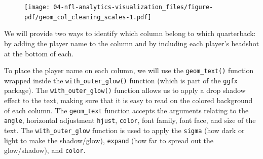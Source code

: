 \documentclass[
  letterpaper,
]{krantz}
\newenvironment{Shaded}{\begin{snugshade}}{\end{snugshade}}
\newcommand{\AttributeTok}[1]{\textcolor[rgb]{0.40,0.45,0.13}{#1}}
\newcommand{\DecValTok}[1]{\textcolor[rgb]{0.68,0.00,0.00}{#1}}
\newcommand{\FunctionTok}[1]{\textcolor[rgb]{0.28,0.35,0.67}{#1}}
\newcommand{\NormalTok}[1]{\textcolor[rgb]{0.00,0.23,0.31}{#1}}
\newcommand{\SpecialCharTok}[1]{\textcolor[rgb]{0.37,0.37,0.37}{#1}}
\newcommand{\StringTok}[1]{\textcolor[rgb]{0.13,0.47,0.30}{#1}}
\begin{document}
\begin{Shaded}
\end{Shaded}

\begin{figure}[H]

{\centering \texttt{[image: 04-nfl-analytics-visualization\_files/figure-pdf/geom\_col\_cleaning\_scales-1.pdf]}

}

\end{figure}

We will provide two ways to identify which column belong to which
quarterback: by adding the player name to the column and by including
each player's headshot at the bottom of each.

To place the player name on each column, we will use the
\texttt{geom\_text()} function wrapped inside the
\texttt{with\_outer\_glow()} function (which is part of the
\texttt{ggfx} package). The \texttt{with\_outer\_glow()} function allows
us to apply a drop shadow effect to the text, making sure that it is
easy to read on the colored background of each column. The
\texttt{geom\_text} function accepts the arguments relating to the
\texttt{angle}, horizontal adjustment \texttt{hjust}, \texttt{color},
font family, font face, and size of the text. The
\texttt{with\_outer\_glow} function is used to apply the \texttt{sigma}
(how dark or light to make the shadow/glow), \texttt{expand} (how far to
spread out the glow/shadow), and \texttt{color}.
\end{document}
